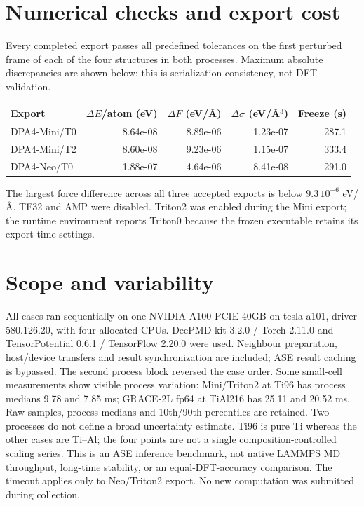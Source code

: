 \section*{Numerical checks and export cost}
Every completed export passes all predefined tolerances on the first perturbed
frame of each of the four structures in both processes. Maximum absolute discrepancies
are shown below; this is serialization consistency, not DFT validation.
\begin{center}\small
\begin{tabular}{@{}lrrrr@{}}
\toprule
Export & $\Delta E$/atom (eV) & $\Delta F$ (eV/\AA) & $\Delta\sigma$ (eV/\AA$^3$) & Freeze (s) \\
\midrule
DPA4-Mini/T0 & 8.64e-08 & 8.89e-06 & 1.23e-07 & 287.1 \\
DPA4-Mini/T2 & 8.60e-08 & 9.23e-06 & 1.15e-07 & 333.4 \\
DPA4-Neo/T0 & 1.88e-07 & 4.64e-06 & 8.41e-08 & 291.0 \\
\bottomrule
\end{tabular}\end{center}
The largest force difference across all three accepted exports is below
$9.3\,10^{-6}$ eV/\AA. TF32 and AMP were disabled. Triton2 was enabled during
the Mini export; the runtime environment reports Triton0 because the frozen
executable retains its export-time settings.
\section*{Scope and variability}
All cases ran sequentially on one NVIDIA A100-PCIE-40GB on tesla-a101, driver
580.126.20, with four allocated CPUs. DeePMD-kit 3.2.0 / Torch 2.11.0 and
TensorPotential 0.6.1 / TensorFlow 2.20.0 were used. Neighbour preparation,
host/device transfers and result synchronization are included; ASE result caching is bypassed.
The second process block reversed the case order. Some small-cell measurements show
visible process variation: Mini/Triton2 at Ti96 has process medians 9.78 and 7.85 ms;
GRACE-2L fp64 at TiAl216 has 25.11 and 20.52 ms. Raw samples, process medians and
10th/90th percentiles are retained. Two processes do not define a broad uncertainty estimate.
Ti96 is pure Ti whereas the other cases are Ti--Al; the four points are not a single
composition-controlled scaling series. This is an ASE inference benchmark, not native
LAMMPS MD throughput, long-time stability, or an equal-DFT-accuracy comparison.
The timeout applies only to Neo/Triton2 export. No new computation was submitted during collection.
